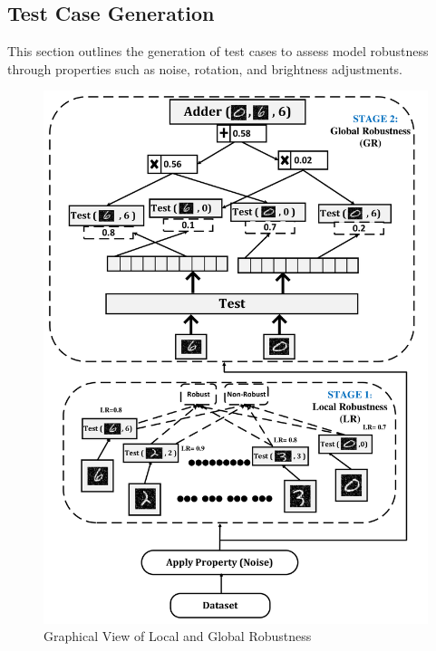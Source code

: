 \documentclass[10pt, conference, a4paper, final]{IEEEtran}
\begin{document}
\subsection{Test Case Generation}

This section outlines the generation of test cases to assess model robustness through properties such as noise, rotation, and brightness adjustments.

\begin{figure}{}
    \centering
    \includegraphics[width=\linewidth]{paper_images/step4.pdf}
    \caption{Graphical View of Local and Global Robustness}
    \label{fig:graph}
\end{figure}
\end{document}
